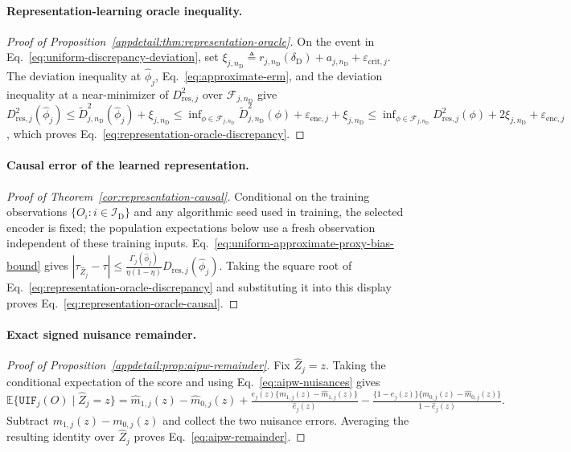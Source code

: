 \paragraph{Representation-learning oracle inequality.}
\begin{proof}[Proof of Proposition~\ref{appdetail:thm:representation-oracle}]
On the event in Eq.~\eqref{eq:uniform-discrepancy-deviation}, set
\(\xi_{j,n_{\mathrm D}} \triangleq r_{j,n_{\mathrm D}}(\delta_{\mathrm D})+a_{j,n_{\mathrm D}}+\varepsilon_{\mathrm{crit},j}.\)
The deviation inequality at $\widehat\phi_j$, Eq.~\eqref{eq:approximate-erm}, and the deviation inequality at a near-minimizer of $D_{\mathrm{res},j}^2$ over $\mathcal F_{j,n_{\mathrm D}}$ give
\(D_{\mathrm{res},j}^2(\widehat\phi_j) \le \widetilde D_{j,n_{\mathrm D}}^2(\widehat\phi_j)+\xi_{j,n_{\mathrm D}} \le \inf_{\phi\in\mathcal F_{j,n_{\mathrm D}}} \widetilde D_{j,n_{\mathrm D}}^2(\phi) +\varepsilon_{\mathrm{enc},j}+\xi_{j,n_{\mathrm D}} \le \inf_{\phi\in\mathcal F_{j,n_{\mathrm D}}} D_{\mathrm{res},j}^2(\phi) +2\xi_{j,n_{\mathrm D}}+\varepsilon_{\mathrm{enc},j}\),
which proves Eq.~\eqref{eq:representation-oracle-discrepancy}.
\end{proof}

\paragraph{Causal error of the learned representation.}
\begin{proof}[Proof of Theorem~\ref{cor:representation-causal}]
Conditional on the training observations $\{O_i:i\in\mathcal I_{\mathrm D}\}$ and any algorithmic seed used in training, the selected encoder is fixed; the population expectations below use a fresh observation independent of these training inputs. Eq.~\eqref{eq:uniform-approximate-proxy-bias-bound} gives
\(|\tau_{\widehat Z_j}-\tau| \le \frac{\Gamma_j(\widehat\phi_j)}{\eta(1-\eta)} D_{\mathrm{res},j}(\widehat\phi_j).\)
Taking the square root of Eq.~\eqref{eq:representation-oracle-discrepancy} and substituting it into this display proves Eq.~\eqref{eq:representation-oracle-causal}.
\end{proof}

\paragraph{Exact signed nuisance remainder.}
\begin{proof}[Proof of Proposition~\ref{appdetail:prop:aipw-remainder}]
Fix $\widehat Z_j=z$. Taking the conditional expectation of the score and using Eq.~\eqref{eq:aipw-nuisances} gives
\(\mathbb E\{\mathtt{UIF}_j(O)\mid\widehat Z_j=z\} ={} \widehat m_{1,j}(z)-\widehat m_{0,j}(z)+ \frac{e_j(z)\{m_{1,j}(z)-\widehat m_{1,j}(z)\}} {\widehat e_j(z)}- \frac{\{1-e_j(z)\}\{m_{0,j}(z)-\widehat m_{0,j}(z)\}} {1-\widehat e_j(z)}.\)
Subtract $m_{1,j}(z)-m_{0,j}(z)$ and collect the two nuisance errors. Averaging the resulting identity over $\widehat Z_j$ proves Eq.~\eqref{eq:aipw-remainder}.
\end{proof}

